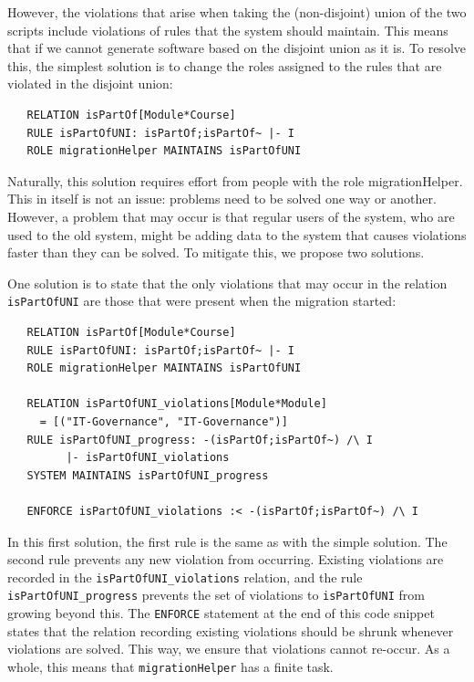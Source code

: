\documentclass{elsarticle}
\begin{document}
However, the violations that arise when taking the (non-disjoint) union of the two scripts include violations of rules that the system should maintain.
This means that if we cannot generate software based on the disjoint union as it is.
To resolve this, the simplest solution is to change the roles assigned to the rules that are violated in the disjoint union:
\begin{verbatim}
   RELATION isPartOf[Module*Course]
   RULE isPartOfUNI: isPartOf;isPartOf~ |- I
   ROLE migrationHelper MAINTAINS isPartOfUNI
\end{verbatim}

Naturally, this solution requires effort from people with the role migrationHelper.
This in itself is not an issue: problems need to be solved one way or another.
However, a problem that may occur is that regular users of the system, who are used to the old system, might be adding data to the system that causes violations faster than they can be solved.
To mitigate this, we propose two solutions.

One solution is to state that the only violations that may occur in the relation \verb=isPartOfUNI= are those that were present when the migration started:
\begin{verbatim}
   RELATION isPartOf[Module*Course]
   RULE isPartOfUNI: isPartOf;isPartOf~ |- I
   ROLE migrationHelper MAINTAINS isPartOfUNI
   
   RELATION isPartOfUNI_violations[Module*Module]
     = [("IT-Governance", "IT-Governance")]
   RULE isPartOfUNI_progress: -(isPartOf;isPartOf~) /\ I
         |- isPartOfUNI_violations
   SYSTEM MAINTAINS isPartOfUNI_progress
   
   ENFORCE isPartOfUNI_violations :< -(isPartOf;isPartOf~) /\ I  
\end{verbatim}

In this first solution, the first rule is the same as with the simple solution.
The second rule prevents any new violation from occurring.
Existing violations are recorded in the \verb=isPartOfUNI_violations= relation, and the rule \verb=isPartOfUNI_progress= prevents the set of violations to \verb=isPartOfUNI= from growing beyond this.
The \verb=ENFORCE= statement at the end of this code snippet states that the relation recording existing violations should be shrunk whenever violations are solved.
This way, we ensure that violations cannot re-occur.
As a whole, this means that \verb=migrationHelper= has a finite task.
\end{document}
